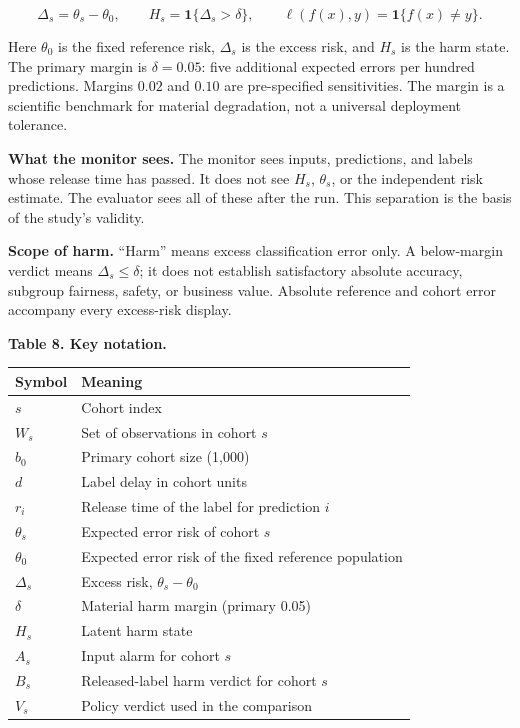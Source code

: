 \documentclass[
]{article}
\begin{document}
\[
\Delta_s=\theta_s-\theta_0,
\qquad
H_s=\mathbf{1}\{\Delta_s>\delta\},
\qquad
\ell(f(x),y)=\mathbf{1}\{f(x)\ne y\}.
\]

Here \(\theta_0\) is the fixed reference risk, \(\Delta_s\) is the
excess risk, and \(H_s\) is the harm state. The primary margin is
\(\delta=0.05\): five additional expected errors per hundred
predictions. Margins \(0.02\) and \(0.10\) are pre-specified
sensitivities. The margin is a scientific benchmark for material
degradation, not a universal deployment tolerance.

\textbf{What the monitor sees.} The monitor sees inputs, predictions,
and labels whose release time has passed. It does not see \(H_s\),
\(\theta_s\), or the independent risk estimate. The evaluator sees all
of these after the run. This separation is the basis of the study's
validity.

\textbf{Scope of harm.} ``Harm'' means excess classification error only.
A below-margin verdict means \(\Delta_s\le\delta\); it does not
establish satisfactory absolute accuracy, subgroup fairness, safety, or
business value. Absolute reference and cohort error accompany every
excess-risk display.

\textbf{Table 8. Key notation.}

\begin{longtable}[]{@{}ll@{}}
\toprule
Symbol & Meaning \\
\midrule
\endhead
\(s\) & Cohort index \\
\(W_s\) & Set of observations in cohort \(s\) \\
\(b_0\) & Primary cohort size (1,000) \\
\(d\) & Label delay in cohort units \\
\(r_i\) & Release time of the label for prediction \(i\) \\
\(\theta_s\) & Expected error risk of cohort \(s\) \\
\(\theta_0\) & Expected error risk of the fixed reference population \\
\(\Delta_s\) & Excess risk, \(\theta_s-\theta_0\) \\
\(\delta\) & Material harm margin (primary 0.05) \\
\(H_s\) & Latent harm state \\
\(A_s\) & Input alarm for cohort \(s\) \\
\(B_s\) & Released-label harm verdict for cohort \(s\) \\
\(V_s\) & Policy verdict used in the comparison \\
\bottomrule
\end{longtable}
\end{document}
